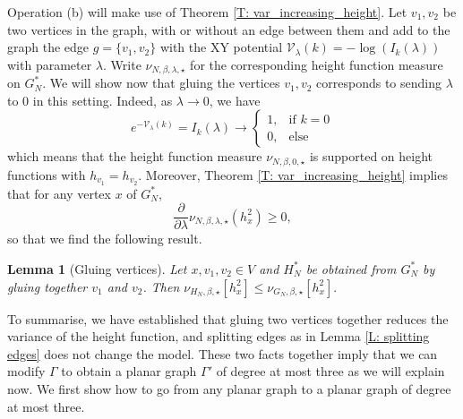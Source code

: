 \documentclass[11pt, reqno]{amsart}
\newtheorem{lemma}[theorem]{Lemma}
\numberwithin{equation}{section}
\theoremstyle{definition}
\theoremstyle{remark}
\renewcommand{\c}[1]{\ensuremath{\mathcal{#1}}}
\newcommand{\exact}{\star}
\begin{document}
Operation (b) will make use of Theorem \ref{T: var_increasing_height}. 
Let $v_1, v_2$ be two vertices in the graph, 
with or without an edge between them and add to the graph the edge $g = \{ v_1, v_2\}$ with the XY potential $\c{V}_{\lambda}(k) = -\log(I_k(\lambda))$ 
with parameter $\lambda$. 
Write $\nu_{N, \beta, \lambda, \exact}$ for the corresponding height function measure on $G_N^*$. 
We will show now that gluing the vertices $v_1, v_2$ corresponds to sending $\lambda$ to $0$ in this setting. 
Indeed, as $\lambda \to 0$, we have
\[
	e^{-\c{V}_\lambda(k)} = I_k(\lambda) \to \begin{cases}
		1, & \text{if } k = 0\\
		0, &\text{else }
	\end{cases} 
\]
which means that the height function measure $\nu_{N, \beta, 0, \exact}$ is supported on height functions with $h_{v_1} = h_{v_2}$. 
Moreover, Theorem \ref{T: var_increasing_height} implies that for any vertex $x$ of $G_N^*$, 
\[
	\frac{\partial}{\partial \lambda} \nu_{N, \beta, \lambda, \exact}(h_x^2) \geq 0, 
\]
so that we find the following result. 

\begin{lemma}[Gluing vertices] \label{L: Gluing vertices}
	Let $x, v_1, v_2 \in V$ and $H_N^*$ be obtained from $G_N^*$ by gluing together $v_1$ and $v_2$. Then
	\(
		\nu_{H_N, \beta, \exact}[h_x^2] \leq \nu_{G_N, \beta, \exact}[h_x^2]. 
	\)
\end{lemma}

To summarise, we have established that gluing two vertices together reduces the variance of the height function, and splitting edges as in Lemma \ref{L: splitting edges} does not change the model. 
These two facts together imply that we can modify $\Gamma$ to obtain a planar graph $\Gamma'$ of degree at most three as we will explain now. 
We first show how to go from any planar graph to a planar graph of degree at most three. 
\end{document}
